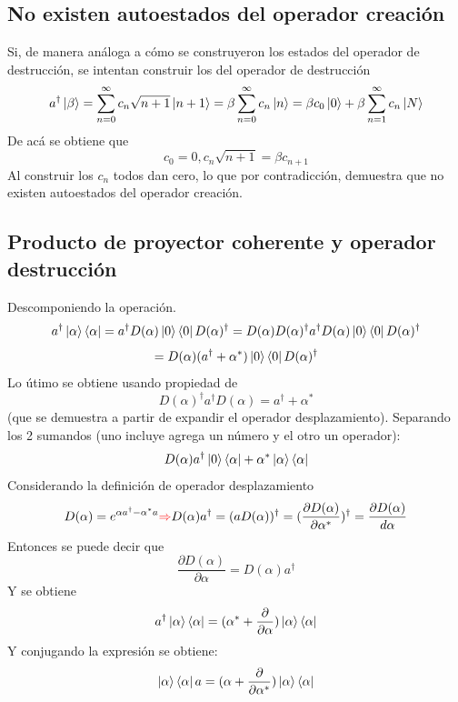 \documentclass{book}
\begin{document}
\subsection{No existen autoestados del operador creación}Si, de manera análoga a cómo se construyeron los estados del operador de destrucción, se intentan construir los del operador de destrucción
    \begin{equation}{ a^\dag\ket{\beta}=\sum_{n=0}^\infty c_n\sqrt{n+1}\ket{n+1}=\beta\sum_{n=0}^\infty c_n\ket{n}=\beta c_0\ket{0}+\beta \sum_{n=1}^\infty c_n\ket{N} }\end{equation}
    De acá se obtiene que
    \begin{equation}{ c_0=0, c_n\sqrt{n+1}=\beta c_{n+1}} \end{equation}
    Al construir los ${c_n}$ todos dan cero, lo que por contradicción, demuestra que no existen autoestados del operador creación.
    \subsection{Producto de proyector coherente y operador destrucción} Descomponiendo la operación.
    \begin{equation}{a^\dag\ket{\alpha}\bra{\alpha}=a^\dag D(\alpha)\ket{0}\bra{0} D(\alpha)^\dag=D(\alpha) D(\alpha)^\dag a^\dag D(\alpha)\ket{0}\bra{0} D(\alpha)^\dag} \end{equation} \begin{equation}{=D(\alpha)(a^\dag+\alpha^*)\ket{0}\bra{0}D(\alpha)^\dag} \end{equation} Lo útimo se obtiene usando propiedad de \begin{equation}D(\alpha)^\dag a^\dag D(\alpha)=a^\dag+\alpha^*\end{equation} (que se demuestra a partir de expandir el operador desplazamiento). Separando los 2 sumandos (uno incluye agrega un número y el otro un operador): 
    \begin{equation}{ D(\alpha)a^\dag\ket{0}\bra{\alpha}+\alpha^*\ket{\alpha}\bra{\alpha}} \end{equation} Considerando la definición de operador desplazamiento
    \begin{equation}{ D(\alpha)=e^{\alpha a^\dag-\alpha^* a}\textcolor{red}{\Rightarrow} D(\alpha)a^{\dag}=(a D(\alpha))^\dag=(\frac{\partial D(\alpha)}{\partial \alpha^*})^\dag=\frac{\partial D(\alpha)}{d\alpha}} \end{equation}
    Entonces se puede decir que \begin{equation}{ \frac{\partial D(\alpha)}{\partial \alpha}=D(\alpha)a^\dag} \end{equation}
    Y se obtiene
    \begin{equation}{a^\dag\ket{\alpha}\bra{\alpha}=(\alpha^*+\frac{\partial}{\partial\alpha})\ket{\alpha}\bra{\alpha}} \end{equation}
    Y conjugando la expresión se obtiene:
    \begin{equation}{ \ket{\alpha}\bra{\alpha} a=(\alpha+\frac{\partial}{\partial\alpha^*})\ket{\alpha}\bra{\alpha}} \end{equation}
\end{document}
